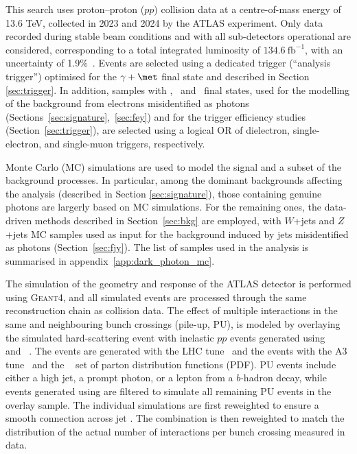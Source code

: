 

This search uses proton--proton (\(pp\)) collision data at a centre-of-mass energy of 13.6 TeV, collected in 2023 and 2024 by the ATLAS experiment. Only data recorded during stable beam conditions and with all sub-detectors operational are considered, corresponding to a total integrated luminosity of $134.6~\mathrm{fb}^{-1}$, with an uncertainty of 1.9\%~\cite{ATL-DAPR-PUB-2025-001}. Events are selected using a dedicated trigger (``analysis trigger'') optimised for the $\gamma+\met$ final state and described in Section \ref{sec:trigger}. In addition, samples with \ee, \ye\ and \ymu\ final states, used for the modelling of the background from electrons misidentified as photons (Sections~\ref{sec:signature},~\ref{sec:fey}) and for the trigger efficiency studies (Section~\ref{sec:trigger}), are selected using a  logical OR of dielectron, single-electron, and single-muon triggers, respectively.

Monte Carlo (MC) simulations are used to model the signal and a subset of the background processes. In particular, among the dominant backgrounds affecting the analysis (described in Section \ref{sec:signature}), those containing genuine photons are largerly based on MC simulations. For the remaining ones, the data-driven methods described in Section~\ref{sec:bkg} are employed, with $W$+jets and $Z$+jets MC samples used as input for the background induced by jets misidentified as photons (Section~\ref{sec:fjy}).
The list of samples used in the analysis is summarised in appendix~\ref{app:dark_photon_mc}.

The simulation of the geometry and response of the ATLAS detector is performed using \textsc{Geant4}, and all simulated events are processed through the same reconstruction chain as collision data. The effect of multiple interactions in the same and neighbouring bunch crossings (pile-up, PU), 
is modeled by overlaying~\cite{SIMU-2020-01} the simulated hard-scattering event 
with inelastic \(pp\) events generated using \EPOS[2.0.1.4]~\cite{Werner:2005jf} and \PYTHIA[8.308]~\cite{Bierlich:2022pfr}.
The \EPOS  events are generated with the \EPOS  LHC tune~\cite{Pierog:2013ria} 
and the \PYTHIA  events with the A3 tune~\cite{ATL-PHYS-PUB-2016-017} 
and the \NNPDF[2.3lo]~\cite{Ball:2012cx} set of parton distribution functions (PDF).
\PYTHIA  PU events include either a high \pT jet, 
a prompt photon, or a lepton from a $b$-hadron decay, 
while events generated using \EPOS  are filtered to simulate all remaining PU events in the overlay sample.
The individual simulations are first reweighted to ensure a smooth connection across jet \pt. The combination is then reweighted to match the distribution of the actual number of interactions per bunch crossing measured in data. 
 

